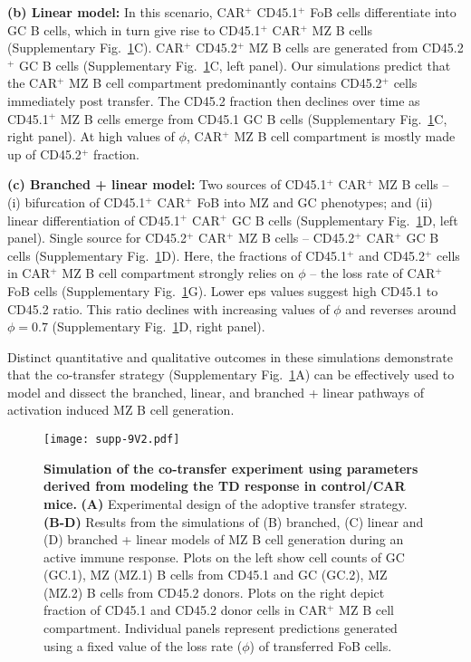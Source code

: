\documentclass[11pt]{article}
\begin{document}
\textbf{(b) Linear model:}
In this scenario, CAR$^{+}$ CD45.1$^{+}$ FoB cells differentiate into GC B cells, which in turn give rise to CD45.1$^{+}$ CAR$^{+}$ MZ B cells (Supplementary Fig.~\ref{fig:co-transf}C). 
CAR$^{+}$ CD45.2$^{+}$ MZ B cells are generated from CD45.2$^{+}$ GC B cells (Supplementary Fig.~\ref{fig:co-transf}C, left panel).
Our simulations predict that the CAR$^{+}$ MZ B cell compartment predominantly contains CD45.2$^{+}$ cells immediately post transfer.
The CD45.2 fraction then declines over time as CD45.1$^{+}$ MZ B cells emerge from CD45.1 GC B cells (Supplementary Fig.~\ref{fig:co-transf}C, right panel).
At high values of $\phi$, CAR$^{+}$ MZ B cell compartment is mostly made up of CD45.2$^{+}$ fraction. 

\textbf{(c) Branched + linear model:}
Two sources of CD45.1$^{+}$ CAR$^{+}$ MZ B cells -- (i) bifurcation of CD45.1$^{+}$ CAR$^{+}$ FoB into MZ and GC phenotypes; and (ii)
linear differentiation of CD45.1$^{+}$ CAR$^{+}$ GC B cells (Supplementary Fig.~\ref{fig:co-transf}D, left panel). 
Single source for CD45.2$^{+}$ CAR$^{+}$  MZ B cells -- CD45.2$^{+}$ CAR$^{+}$ GC B cells (Supplementary Fig.~\ref{fig:co-transf}D).
Here, the fractions of CD45.1$^{+}$ and CD45.2$^{+}$ cells in CAR$^{+}$ MZ B cell compartment strongly relies on $\phi$ -- the loss rate of CAR$^{+}$ FoB cells (Supplementary Fig.~\ref{fig:co-transf}G).
Lower eps values suggest high CD45.1 to CD45.2 ratio. This ratio declines with increasing values of $\phi$ and reverses around $\phi = 0.7$ (Supplementary Fig.~\ref{fig:co-transf}D, right panel).

Distinct quantitative and qualitative outcomes in these simulations demonstrate that the co-transfer strategy (Supplementary Fig.~\ref{fig:co-transf}A) can be effectively used to model and dissect the branched, linear, and branched + linear pathways of activation induced MZ B cell generation.

 
 
\clearpage


\begin{figure}[htbp]
\center
\texttt{[image: supp-9V2.pdf]}
\caption{
    \textbf{Simulation of the co-transfer experiment using parameters derived from modeling the TD response in control/CAR mice.}
    \textbf{(A)} Experimental design of the adoptive transfer strategy.
    \textbf{(B-D)} Results from the simulations of (B) branched, (C) linear and (D) branched + linear models of MZ B cell generation during an active immune response.
    Plots on the left  show cell counts of GC (GC.1), MZ (MZ.1) B cells from CD45.1 and GC (GC.2), MZ (MZ.2) B cells from CD45.2 donors.
    Plots on the right depict fraction of CD45.1 and CD45.2 donor cells in CAR$^+$ MZ B cell compartment.
    Individual panels represent predictions generated using a fixed value of the loss rate ($\phi$) of transferred FoB cells.
    }
       \label{fig:co-transf}
 \end{figure}
 
\end{document}
